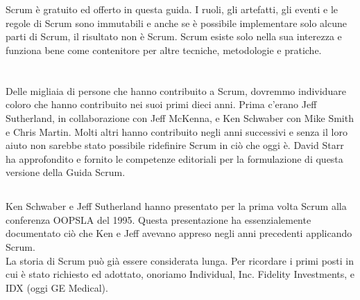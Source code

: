 
\section*{\color{Blue}{Conclusioni}}
\label{sec:conclusion}
Scrum è gratuito ed offerto in questa guida. I ruoli, gli artefatti, gli eventi e le regole di Scrum sono immutabili e anche se \`e 
possibile implementare solo alcune parti di Scrum, il risultato non \`e Scrum. Scrum esiste solo nella sua interezza e funziona bene come 
contenitore per altre tecniche, metodologie e pratiche.


\section*{\color{Blue}{Ringraziamenti}}
\label{sec:acknowledgements}

\subsection*{\color{SteelBlue}{Persone}}
\label{sec:people}
Delle migliaia di persone che hanno contribuito a Scrum, dovremmo individuare coloro che hanno contribuito nei suoi
primi dieci anni. Prima c'erano Jeff Sutherland, in collaborazione con Jeff McKenna, e Ken Schwaber con Mike Smith e
Chris Martin. Molti altri hanno contribuito negli anni successivi e senza il loro aiuto non sarebbe stato possibile ridefinire Scrum in 
ci\`o che oggi \`e. David Starr ha approfondito e fornito le competenze editoriali per la formulazione di questa versione della Guida Scrum.

\subsection*{\color{SteelBlue}{Storia}}
\label{sec:history}
Ken Schwaber e Jeff Sutherland hanno presentato per la prima volta Scrum alla conferenza OOPSLA del 1995. Questa presentazione ha 
essenzialemente documentato ci\`o che Ken e Jeff avevano appreso negli anni precedenti applicando Scrum.
\newline
\\La storia di Scrum pu\`o gi\`a essere considerata lunga. Per ricordare i primi posti in cui \`e stato richiesto ed adottato, onoriamo 
Individual, Inc. Fidelity Investments, e IDX (oggi GE Medical).

